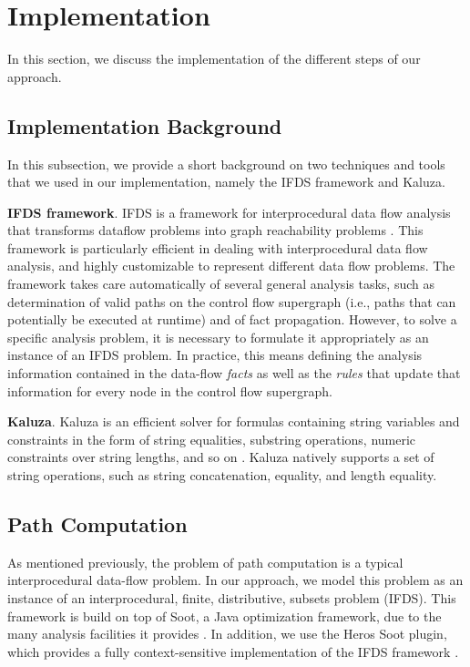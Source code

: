 \section{Implementation}
\label{sec:implementation}


In this section, we discuss the implementation of the different steps of our approach.

{\color{orange}
\subsection{Implementation Background}
In this subsection, we provide a short background on two techniques and tools that we used in our implementation, namely the IFDS framework and Kaluza. 

\noindent
\textbf{IFDS framework}.
IFDS is a framework for interprocedural data flow analysis that transforms dataflow problems into graph reachability problems \cite{ifds,Bodden:2012:IDA:2259051.2259052}. This framework  is particularly efficient in dealing with interprocedural data flow analysis, and highly customizable to represent different data flow problems. The framework takes care automatically of several general analysis tasks, such as
determination of valid paths on the control flow supergraph (i.e., paths that can potentially be executed at runtime) and of fact propagation. However, to solve a specific analysis problem, it is necessary to formulate it appropriately as an instance of an IFDS problem. In practice, this means defining the analysis information contained in the data-flow \emph{facts} as well as the \emph{rules} that update that information for every node in the control flow supergraph. 

\noindent
\textbf{Kaluza}.
Kaluza is an efficient solver for formulas containing string variables and constraints in the form of string equalities, substring operations, numeric constraints over string lengths, and so on  \cite{kaluza,kaluzaKudzu}. Kaluza natively supports a set of string operations, such as string concatenation, equality, and length equality.  

} 

\subsection{Path Computation}
As mentioned previously, the problem of path computation is a typical interprocedural data-flow problem. In our approach, we model this problem as an instance of an interprocedural, finite, distributive, subsets problem (IFDS). This framework is build on top of Soot, a Java optimization framework, due to the many analysis facilities it provides \cite{heros,Bodden:2012:IDA:2259051.2259052,Vallee-Rai:1999:SJB:781995.782008}. In addition, we use the Heros Soot plugin, which provides a fully context-sensitive implementation of the IFDS framework \cite{heros}.

